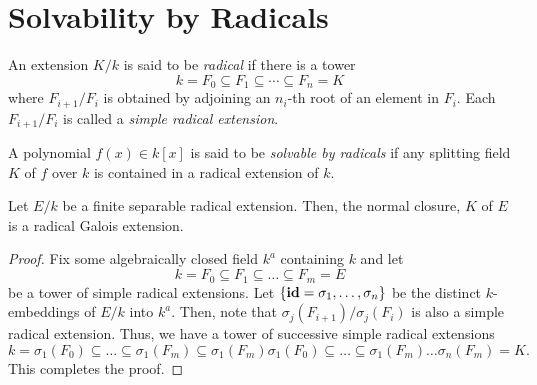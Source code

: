 \section{Solvability by Radicals}

\begin{definition}
    An extension $K/k$ is said to be \emph{radical} if there is a tower 
    \begin{equation*}
        k = F_0\subseteq F_1\subseteq\cdots\subseteq F_n = K
    \end{equation*}
    where $F_{i + 1}/F_i$ is obtained by adjoining an $n_i$-th root of an element in $F_i$. Each $F_{i + 1}/F_i$ is called a \emph{simple radical extension}.
\end{definition}

\begin{definition}
    A polynomial $f(x)\in k[x]$ is said to be \emph{solvable by radicals} if any splitting field $K$ of $f$ over $k$ is contained in a radical extension of $k$.
\end{definition}

\begin{lemma}
    Let $E/k$ be a finite separable radical extension. Then, the normal closure, $K$ of $E$ is a radical Galois extension.
\end{lemma}
\begin{proof}
    Fix some algebraically closed field $k^a$ containing $k$ and let 
    \begin{equation*}
        k = F_0\subseteq F_1\subseteq\dots\subseteq F_m = E
    \end{equation*}
    be a tower of simple radical extensions. Let $\{\mathbf{id} = \sigma_1,\dots,\sigma_n\}$ be the distinct $k$-embeddings of $E/k$ into $k^a$. Then, note that $\sigma_j(F_{i + 1})/\sigma_j(F_i)$ is also a simple radical extension. Thus, we have a tower of successive simple radical extensions
    \begin{equation*}
        k = \sigma_1(F_0)\subseteq\dots\subseteq\sigma_1(F_m)\subseteq\sigma_1(F_m)\sigma_1(F_0)\subseteq\dots\subseteq\sigma_1(F_m)\dots\sigma_n(F_m) = K.
    \end{equation*}
    This completes the proof.
\end{proof}

